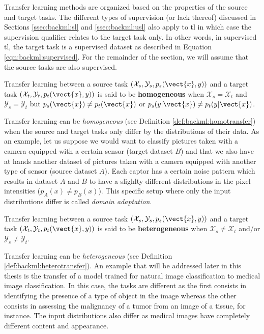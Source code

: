 Transfer learning methods are organized based on the properties of the source and
target tasks. The different types of supervision (or lack thereof) discussed in
Sections \ref{ssec:backml:sl} and \ref{ssec:backml:usl} also apply to \acrlong{tl}
in which case the supervision qualifier relates to the target task only. In other
words, in supervised \acrlong{tl}, the target task is a supervised dataset as
described in Equation \ref{eqn:backml:supervised}. For the remainder of the section,
we will assume that the source tasks are also supervised.

\begin{definition}
  \label{def:backml:homotransfer}
  Transfer learning between a source task $\left(\mathcal{X}_{s}, \mathcal{Y}_{s}, p_{s}(\vect{x}, y)\right)$ and a target task $\left(\mathcal{X}_t, \mathcal{Y}_t, p_t(\vect{x}, y)\right)$ is said to be \textbf{homogeneous} when $\mathcal{X}_s = \mathcal{X}_t$ and $\mathcal{Y}_s = \mathcal{Y}_t$ but $p_s(\vect{x}) \neq p_t(\vect{x})$ or $p_s(y|\vect{x}) \neq p_t(y|\vect{x})$.
\end{definition}

Transfer learning can be \textit{homogeneous} (see Definition \ref{def:backml:homotransfer})
when the source and target tasks only differ by the distributions of their data.
As an example, let us suppose we would want to classify pictures taken with a
camera equipped with a certain sensor (target dataset $B$) and that we also have
at hands another dataset of pictures taken with a camera equipped with another
type of sensor (source dataset $A$). Each captor has a certain noise pattern which
results in dataset $A$ and $B$ to have a slighlty different distributions in the
pixel intensities (\ie $p_A(x) \neq p_B(x)$). This specific setup where only the
input distributions differ is called \textit{domain adaptation}.

\begin{definition}
  \label{def:backml:heterotransfer}
  Transfer learning between a source task $\left(\mathcal{X}_{s}, \mathcal{Y}_{s}, p_{s}(\vect{x}, y)\right)$ and a target task $\left(\mathcal{X}_t, \mathcal{Y}_t, p_t(\vect{x}, y)\right)$ is said to be \textbf{heterogeneous} when $\mathcal{X}_s \neq \mathcal{X}_t$ and/or $\mathcal{Y}_s \neq \mathcal{Y}_t$.
\end{definition}

Transfer learning can be \textit{heterogeneous} (see Definition
\ref{def:backml:heterotransfer}). An example that will be addressed later in this
thesis is the transfer of a model trained for natural image classification to
medical image classification. In this case, the tasks are different as the first
consists in identifying the presence of a type of object in the image whereas the
other consists in assessing the malignancy of a tumor from an image of a tissue, for instance.
The input distributions also differ as medical images have completely different
content and appearance.


